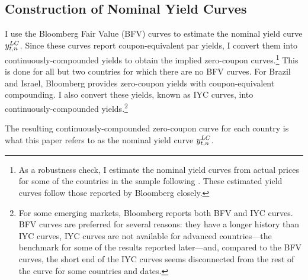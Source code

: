 {\subsection{Construction of Nominal Yield Curves} \label{sec:YCnom}
\iftoggle{toclinks}{\gototoc}{} %

I use the Bloomberg Fair Value (BFV) curves to estimate the nominal yield curve \(y_{t,n} ^{LC}\).
Since these curves report coupon-equivalent par yields, I convert them into continuously-compounded yields
\citep*[see][]{GSW:2007} to obtain the implied zero-coupon curves.\footnote{As a robustness check, I estimate the nominal yield curves from actual prices for some of the countries in the sample following \cite{NelsonSiegel:1987}. These estimated yield curves follow those reported by Bloomberg closely.} This is done for all but two countries for which there are no BFV curves.
For Brazil and Israel, Bloomberg provides zero-coupon yields with coupon-equivalent compounding.
I also convert these yields, known as IYC curves, into continuously-compounded yields.\footnote{ For some emerging markets, Bloomberg reports both BFV and IYC curves. BFV curves are preferred for several reasons: they have a longer history than IYC curves, IYC curves are not available for advanced countries---the benchmark for some of the results reported later---and, compared to the BFV curves, the short end of the IYC curves seems disconnected from the rest of the curve for some countries and dates.} 

The resulting continuously-compounded zero-coupon curve for each country is what this paper refers to as the nominal yield curve \(y_{t,n} ^{LC}\).


}
